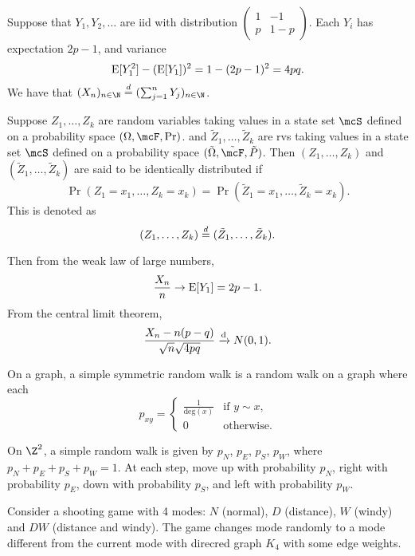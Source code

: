 \begin{examples}
    Suppose that $Y_1, Y_2, \dots$ are iid with distribution
    $\begin{pmatrix}
        1 & -1 \\
        p & 1-p
    \end{pmatrix}$.
    Each $Y_i$ has expectation $2p - 1$, and variance \[
        \operatorname{\mathrm{E}}[Y_1^2] - (\operatorname{\mathrm{E}}[Y_1])^2 = 1 - (2p - 1)^2 = 4pq.
    \]
    We have that $(X_n)_{n \in \N} \eqd (\sum_{j=1}^{n} Y_j)_{n \in \N}$.
    \begin{definition}
        Suppose $Z_1, \dots, Z_k$ are random variables taking values in a
        state set $\mcS$ defined on a probability space $(\Omega, \mcF, \Pr)$.
        and $\tilde{Z}_1, \dots, \tilde{Z}_k$ are rvs taking values in a
        state set $\mcS$ defined on a probability space
        $(\tilde{\Omega}, \tilde{\mcF}, \tilde{P})$.
        Then $(Z_1, \dots, Z_k)$ and $(\tilde{Z}_1, \dots, \tilde{Z}_k)$ are
        said to be identically distributed if \[
            \Pr(Z_1 = x_1, \dots, Z_k = x_k)
                = \Pr(\tilde{Z}_1 = x_1, \dots, \tilde{Z}_k = x_k).
        \] This is denoted as \[
            (Z_1, \dots, Z_k) \overset{d}{=} (\tilde{Z}_1, \dots, \tilde{Z}_k).
        \]
    \end{definition}
    Then from the weak law of large numbers, \[
        \frac{X_n}{n} \to \operatorname{\mathrm{E}}[Y_1] = 2p - 1.
    \] From the central limit theorem, \[
        \frac{X_n - n(p - q)}{\sqrt{n} \sqrt{4pq}} \xrightarrow{\text{d}} N(0, 1).
    \]

    On a graph, a simple symmetric random walk is a random walk on a graph
    where each \[
        p_{xy} = \begin{cases}
            \frac1{\mathrm{deg}(x)} & \text{if } y \sim x, \\
            0 & \text{otherwise}.
        \end{cases}
    \]

    On $\Z^2$, a simple random walk is given by $p_N$, $p_E$, $p_S$, $p_W$,
    where $p_N + p_E + p_S + p_W = 1$.
    At each step, move up with probability $p_N$, right with probability $p_E$,
    down with probability $p_S$, and left with probability $p_W$.

    \item Consider a shooting game with 4 modes: $N$ (normal), $D$ (distance),
    $W$ (windy) and $DW$ (distance and windy).
    The game changes mode randomly to a mode different from the current mode
    with direcred graph $K_4$ with some edge weights.
\end{examples}

